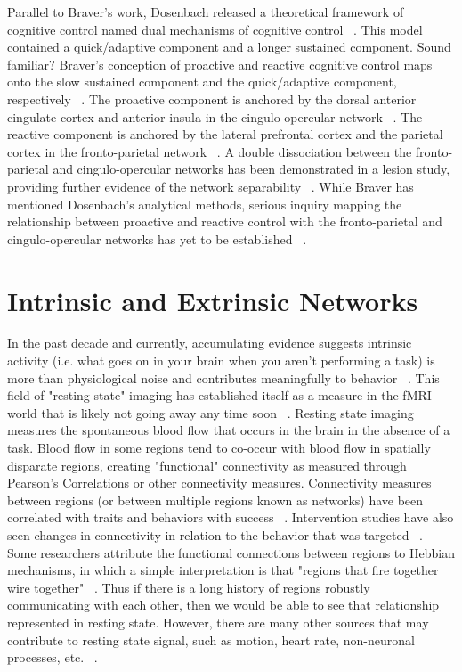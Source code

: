 \documentclass[phd,appendix,figures]{uithesis}
\begin{document}
Parallel to Braver's work, Dosenbach released a theoretical framework of cognitive control named dual mechanisms of cognitive control ~\citep{Dosenbach2007}. 
This model contained a quick/adaptive component and a longer sustained component.
Sound familiar?
Braver's conception of proactive and reactive cognitive control maps onto the slow sustained component and the quick/adaptive component, respectively ~\citep{Braver2012}.
The proactive component is anchored by the dorsal anterior cingulate cortex and anterior insula in the cingulo-opercular network ~\citep{Dosenbach2008}.
The reactive component is anchored by the lateral prefrontal cortex and the parietal cortex in the fronto-parietal network ~\citep{Dosenbach2008}.
A double dissociation between the fronto-parietal and cingulo-opercular networks has been demonstrated in a lesion study, providing further evidence of the network separability ~\citep{nomura2010b}.
While Braver has mentioned Dosenbach's analytical methods, serious inquiry mapping the relationship between proactive and reactive control with the fronto-parietal and cingulo-opercular networks has yet to be established ~\citep{Braver2006,Cooper2015}.

\section{Intrinsic and Extrinsic Networks}

In the past decade and currently, accumulating evidence suggests intrinsic activity (i.e. what goes on in your brain when you aren't performing a task) is more than physiological noise and contributes meaningfully to behavior ~\citep{Busch2010,Kenet2003,McCormick1999,Mateo2017}.
This field of "resting state" imaging has established itself as a measure in the fMRI world that is likely not going away any time soon ~\citep{VandenHeuvel2010,Shen2015}.
Resting state imaging measures the spontaneous blood flow that occurs in the brain in the absence of a task.
Blood flow in some regions tend to co-occur with blood flow in spatially disparate regions, creating "functional" connectivity as measured through Pearson's Correlations or other connectivity measures.
Connectivity measures between regions (or between multiple regions known as networks) have been correlated with traits and behaviors with success ~\citep{Dennis2011,Duchek2013}.
Intervention studies have also seen changes in connectivity in relation to the behavior that was targeted ~\citep{Horowitz-Kraus2015}.
Some researchers attribute the functional connections between regions to Hebbian mechanisms, in which a simple interpretation is that "regions that fire together wire together" ~\citep{Harmelech2013}.
Thus if there is a long history of regions robustly communicating with each other, then we would be able to see that relationship represented in resting state.
However, there are many other sources that may contribute to resting state signal, such as motion, heart rate, non-neuronal processes, etc. ~\citep{Winder2017,Murphy2013}.
\end{document}
